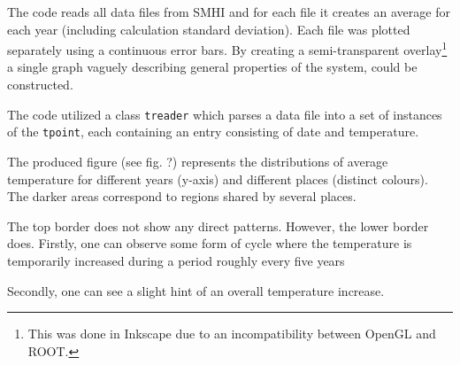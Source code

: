 The code reads all data files from SMHI and for each file it creates an average for each year (including calculation standard deviation). Each file was plotted separately using a continuous error bars. By creating a semi-transparent overlay\footnote{This was done in Inkscape due to an incompatibility between OpenGL and ROOT.} a single graph vaguely describing general properties of the system, could be constructed.

The code utilized a class \texttt{treader} which parses a data file into a set of instances of the \texttt{tpoint}, each containing an entry consisting of date and temperature.

The produced figure (see fig. ?) represents the distributions of average temperature for different years (y-axis) and different places (distinct colours). The darker areas correspond to regions shared by several places.

The top border does not show any direct patterns. However, the lower border does. Firstly, one can observe some form of cycle where the temperature is temporarily increased during a period roughly every five years

Secondly, one can see a slight hint of an overall temperature increase.
